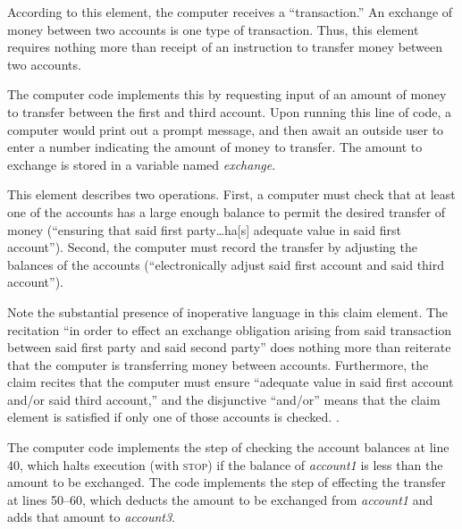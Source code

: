\documentclass{scotus}
\begin{document}

According to this element, the computer receives a ``transaction.'' An exchange
of money between two accounts is one type of transaction. Thus, this element
requires nothing more than receipt of an instruction to transfer money between
two accounts.

The computer code implements this by requesting input of an amount of money to
transfer between the first and third account. Upon running this line of code,
a computer would print out a prompt message, and then await an outside user to
enter a number indicating the amount of money to transfer. The amount to
exchange is stored in a variable named \emph{exchange}.


This element describes two operations. First, a computer must check that at
least one of the accounts has a large enough balance to permit the desired
transfer of money (``ensuring that said first party\ldots ha[s] adequate value
in
said first account''). Second, the computer must record the transfer by
adjusting the balances of the accounts (``electronically adjust said first
account and said third account'').

Note the substantial presence of inoperative language in this claim element. The
recitation ``in order to effect an exchange obligation arising from said
transaction between said first party and said second party'' does nothing more
than reiterate that the computer is transferring money between accounts.
Furthermore, the claim recites that the computer must ensure ``adequate value in
said first account and/or said third account,'' and the disjunctive ``and/or''
means that the claim element is satisfied if only one of those accounts is
checked. .

The computer code implements the step of checking the account balances at line
40, which halts execution (with \textsc{stop}) if the balance of
\emph{account1} is less than the amount to be exchanged. The code implements the
step of effecting the transfer at lines 50--60, which deducts the amount to be
exchanged from \emph{account1} and adds that amount to \emph{account3}.

\end{document}
